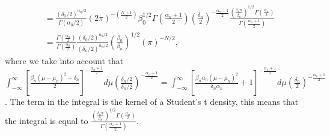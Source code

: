 \begin{enumerate}
{{\begin{align}
	&=\frac{(\delta_0/2)^{\alpha_0/2}}{\Gamma(\alpha_0/2)}(2\pi)^{-\left(\frac{N+1}{2}\right)}\beta_0^{1/2}\Gamma\left(\frac{\alpha_n+1}{2}\right)\left(\frac{\delta_n}{2}\right)^{-\frac{\alpha_n+1}{2}}\frac{\left(\frac{\delta_n\pi}{\beta_n}\right)^{1/2}\Gamma\left(\frac{\alpha_n}{2}\right)}{\Gamma\left(\frac{\alpha_n+1}{2}\right)}\nonumber\\
	&=\frac{\Gamma\left(\frac{\alpha_n}{2}\right)}{\Gamma\left(\frac{\alpha_0}{2}\right)}\frac{(\delta_0/2)^{\alpha_0/2}}{(\delta_n/2)^{\alpha_n/2}}\left(\frac{\beta_0}{\beta_n}\right)^{1/2}(\pi)^{-N/2},\nonumber
\end{align}
}}
where we take into account that $\int_{-\infty}^{\infty} \left[\frac{\beta_n(\mu-\mu_n)^2+\delta_n}{2}\right]^{-\frac{\alpha_n+1}{2}}d\mu\left(\frac{\delta_n/2}{\delta_n/2}\right)^{-\frac{\alpha_n+1}{2}}=\int_{-\infty}^{\infty} \left[\frac{\beta_n\alpha_n(\mu-\mu_n)^2}{\delta_n\alpha_n}+1\right]^{-\frac{\alpha_n+1}{2}}d\mu\left(\frac{\delta_n}{2}\right)^{-\frac{\alpha_n+1}{2}}$. The term in the integral is the kernel of a Student's t density, this means that the integral is equal to $\frac{\left(\frac{\delta_n\pi}{\beta_n}\right)^{1/2}\Gamma\left(\frac{\alpha_n}{2}\right)}{\Gamma\left(\frac{\alpha_n+1}{2}\right)}$.  


\end{enumerate}

